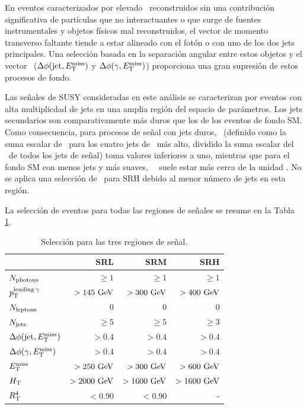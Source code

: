En eventos caracterizados por elevado \met\ reconstruidos sin una contribución significativa de partículas que no interactuantes o que surge de fuentes instrumentales y objetos físicos mal reconstruidos, el vector de momento transverso faltante tiende a
estar alineado con el fotón o con uno de los dos jets principales. Una selección basada en la separación angular entre estos objetos y el vector \met\ ($\Delta\phi(\text{jet}, E_{\text{T}}^{\text{miss}})$ y $\Delta\phi(\gamma, E_{\text{T}}^{\text{miss}})$) proporciona una gran supresión de estos procesos de fondo.

Las señales de SUSY consideradas en este análisis se caracterizan por
eventos con alta multiplicdad de jets en una amplia región del espacio de parámetros. Los jets secundarios son comparativamente más duros que los de los eventos de fondo SM. Como consecuencia, para procesos de señal con jets duros, \rtf\ (definido como la suma escalar de \pt\ para los cuatro jets de \pt\ más alto, dividido la suma escalar del \pt\ de todos los jets de señal) toma valores inferiores a uno, mientras que para el fondo SM con menos jets y más suaves, \ \rtf\ suele estar más cerca de la unidad \cite{SUSY-2016-27}.
No se aplica una selección de \rtf\ para SRH debido al menor número de jets en esta región.

La selección de eventos para todas las regiones de señales se resume en la Tabla \ref{tab:sr_selection}. 

\begin{table}[ht!]
  \centering
  \begin{tabular}{lrrr}
    \hline
    \hline
                                                    &        SRL    &       SRM     &         SRH \\
      \hline
      $N_{\text{photons}}$                        &        $\ge1$ &        $\ge1$ &        $\ge1$ \\
      $p_{\text{T}}^{\text{leading}\: \gamma}$                 &  $>145\ \gev$ &  $>300\ \gev$ &  $>400\ \gev$ \\
      $N_{\text{leptons}}$                        &             0 &             0 &             0 \\
      $N_{\text{jets}}$                           &       $\ge 5$ &       $\ge 5$ &       $\ge 3$ \\
      $\Delta\phi(\text{jet}, E_{\text{T}}^{\text{miss}})$                &        $>0.4$ &        $>0.4$ &        $>0.4$ \\
      $\Delta\phi(\gamma, E_{\text{T}}^{\text{miss}})$                    &        $>0.4$ &        $>0.4$ &        $>0.4$ \\
      $E_{\text{T}}^{\text{miss}}$                                       &  $>250\ \gev$ &  $>300\ \gev$ &  $>600\ \gev$ \\
      $H_{\text{T}}$                                         & $>2000\ \gev$ & $>1600\ \gev$ & $>1600\ \gev$ \\
      $R_{\text{T}}^{4}$                            &       $<0.90$ &       $<0.90$ &             - \\
      \hline
      \hline
    \end{tabular}
  \caption{Selección para las tres regiones de señal.}
  \label{tab:sr_selection}
\end{table}



